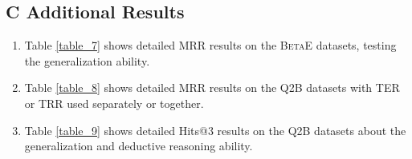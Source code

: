 \subsection*{C  Additional Results}
\begin{enumerate}
\item Table \ref{table_7} shows  detailed MRR results on the \textsc{BetaE} datasets, testing the generalization ability.

\item Table \ref{table_8} shows  detailed MRR results on the Q2B datasets with TER or TRR used separately  or together.

\item Table \ref{table_9} shows  detailed Hits@3 results on the Q2B datasets about the generalization and deductive reasoning ability.

\end{enumerate}



